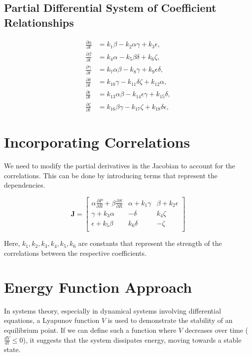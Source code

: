 \documentclass{article}
\begin{document}
\subsection{Partial Differential System of Coefficient Relationships}
\begin{align}
  \frac{\partial \alpha}{\partial t} &= k_1 \beta - k_2 \alpha \gamma + k_3 \epsilon, \\
  \frac{\partial \beta}{\partial t} &= k_4 \alpha - k_5 \beta \delta + k_6 \zeta, \\
  \frac{\partial \gamma}{\partial t} &= k_7 \alpha \beta - k_8 \gamma + k_9 \epsilon \delta, \\
  \frac{\partial \delta}{\partial t} &= k_{10} \gamma - k_{11} \delta \zeta + k_{12} \alpha, \\
  \frac{\partial \epsilon}{\partial t} &= k_{13} \alpha \beta - k_{14} \epsilon \gamma + k_{15} \delta, \\
  \frac{\partial \zeta}{\partial t} &= k_{16} \beta \gamma - k_{17} \zeta + k_{18} \delta \epsilon,
\end{align}

\section*{Incorporating Correlations}
We need to modify the partial derivatives in the Jacobian to account for the correlations. This can be done by introducing terms that represent the dependencies.

\[
\mathbf{J} = \begin{bmatrix}
\alpha \frac{\partial P}{\partial R} + \beta \frac{\partial S}{\partial R} & \alpha + k_1 \gamma & \beta + k_2 \epsilon \\
\gamma + k_3 \alpha & -\delta & k_4 \zeta \\
\epsilon + k_5 \beta & k_6 \delta & -\zeta \\
\end{bmatrix}
\]

Here, \(k_1, k_2, k_3, k_4, k_5, k_6\) are constants that represent the strength of the correlations between the respective coefficients.

\section*{Energy Function Approach}
In systems theory, especially in dynamical systems involving differential equations, a Lyapunov function \( V \) is used to demonstrate the stability of an equilibrium point. If we can define such a function where \( V \) decreases over time (\( \frac{dV}{dt} \leq 0 \)), it suggests that the system dissipates energy, moving towards a stable state.
\end{document}
